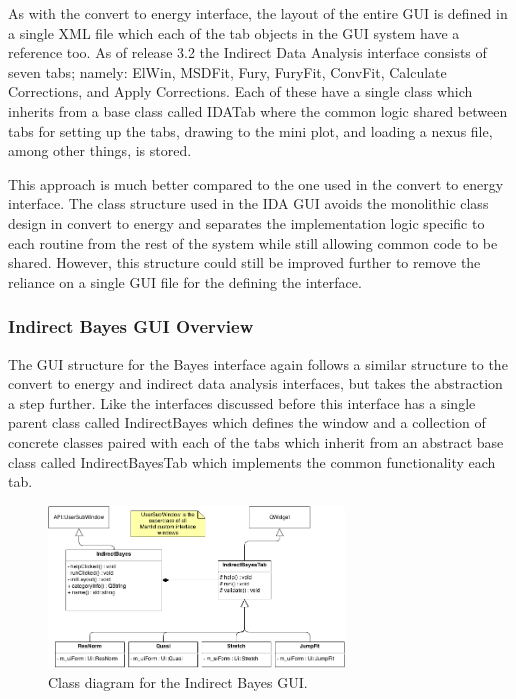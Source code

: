 \documentclass[paper=a4, fontsize=11pt]{scrartcl}	%
\numberwithin{equation}{section}															%
\numberwithin{figure}{section}																%
\numberwithin{table}{section}																%
\begin{document}
As with the convert to energy interface, the layout of the entire GUI is defined in a single XML file which each of the tab objects in the GUI system have a reference too. As of release 3.2 the Indirect Data Analysis interface consists of seven tabs; namely: ElWin, MSDFit, Fury, FuryFit, ConvFit, Calculate Corrections, and Apply Corrections. Each of these have a single class which inherits from a base class called IDATab where the common logic shared between tabs for setting up the tabs, drawing to the mini plot, and loading a nexus file, among other things, is stored.

This approach is much better compared to the one used in the convert to energy interface. The class structure used in the IDA GUI avoids the monolithic class design in convert to energy and separates the implementation logic specific to each routine from the rest of the system while still allowing common code to be shared. However, this structure could still be improved further to remove the reliance on a single GUI file for the defining the interface.

\subsubsection{Indirect Bayes GUI Overview}
\label{subsubsec:Bayes-GUI-Overview}
The GUI structure for the Bayes interface again follows a similar structure to the convert to energy and indirect data analysis interfaces, but takes the abstraction a step further. Like the interfaces discussed before this interface has a single parent class called IndirectBayes which defines the window and a collection of concrete classes paired with each of the tabs which inherit from an abstract base class called IndirectBayesTab which implements the common functionality each tab. 

\begin{figure}[H]
\centering
\includegraphics[width=0.7\textwidth]{img/uml/class_diagrams/Bayes_structure.png}
\caption{Class diagram for the Indirect Bayes GUI.}
\label{fig:indirect-bayes-gui}
\end{figure}
\end{document}
